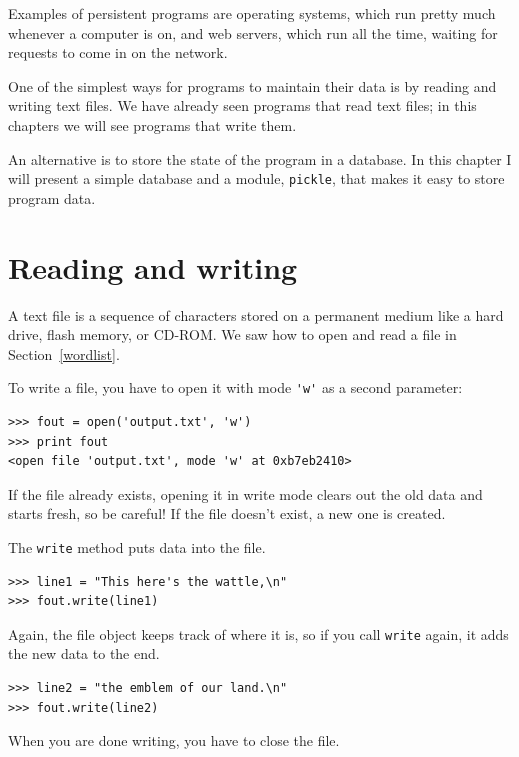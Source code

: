 \documentclass[10pt]{book}
\begin{document}
Examples of persistent programs are operating systems, which
run pretty much whenever a computer is on, and web servers,
which run all the time, waiting for requests to come in on
the network.

One of the simplest ways for programs to maintain their data
is by reading and writing text files.  We have already seen
programs that read text files; in this chapters we will see programs
that write them.

An alternative is to store the state of the program in a database.
In this chapter I will present a simple database and a module,
{\tt pickle}, that makes it easy to store program data.



\section{Reading and writing}


A text file is a sequence of characters stored on a permanent
medium like a hard drive, flash memory, or CD-ROM.  We saw how
to open and read a file in Section~\ref{wordlist}.


To write a file, you have to open it with mode
\verb"'w'" as a second parameter:

\beforeverb
\begin{verbatim}
>>> fout = open('output.txt', 'w')
>>> print fout
<open file 'output.txt', mode 'w' at 0xb7eb2410>
\end{verbatim}
\afterverb
%
If the file already exists, opening it in write mode clears out
the old data and starts fresh, so be careful!
If the file doesn't exist, a new one is created.

The {\tt write} method puts data into the file.

\beforeverb
\begin{verbatim}
>>> line1 = "This here's the wattle,\n"
>>> fout.write(line1)
\end{verbatim}
\afterverb
%
Again, the file object keeps track of where it is, so if
you call {\tt write} again, it adds the new data to the end.

\beforeverb
\begin{verbatim}
>>> line2 = "the emblem of our land.\n"
>>> fout.write(line2)
\end{verbatim}
\afterverb
%
When you are done writing, you have to close the file.
\end{document}
